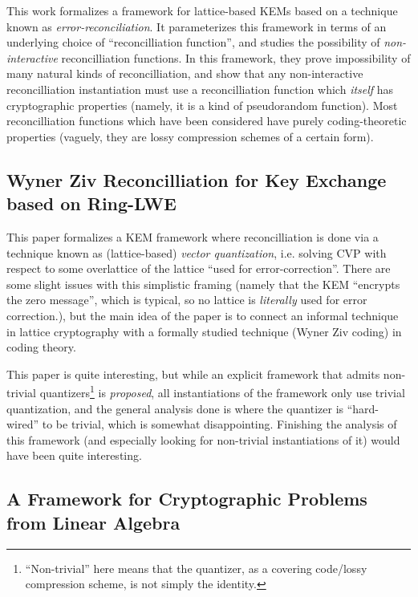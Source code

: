 \documentclass{article}
\begin{document}
	This work formalizes a framework for lattice-based KEMs based on a technique known as \emph{error-reconciliation}.
	It parameterizes this framework in terms of an underlying choice of ``reconcilliation function'', and studies the possibility of \emph{non-interactive} reconcilliation functions.
	In this framework, they prove impossibility of many natural kinds of reconcilliation, and show that any non-interactive reconcilliation instantiation must use a reconcilliation function which \emph{itself} has cryptographic properties (namely, it is a kind of pseudorandom function).
	Most reconcilliation functions which have been considered have purely coding-theoretic properties (vaguely, they are lossy compression schemes of a certain form).
	
	\subsection{Wyner Ziv Reconcilliation for Key Exchange based on Ring-LWE}
	This paper formalizes a KEM framework where reconcilliation is done via a technique known as (lattice-based) \emph{vector quantization}, i.e. solving CVP with respect to some overlattice of the lattice ``used for error-correction''.
	There are some slight issues with this simplistic framing (namely that the KEM ``encrypts the zero message'', which is typical, so no lattice is \emph{literally} used for error correction.), but the main idea of the paper is to connect an informal technique in lattice cryptography with a formally studied technique (Wyner Ziv coding) in coding theory.
	
	This paper is quite interesting, but while an explicit framework that admits non-trivial quantizers\footnote{``Non-trivial'' here means that the quantizer, as a covering code/lossy compression scheme, is not simply the identity.} is \emph{proposed}, all instantiations of the framework only use trivial quantization, and the general analysis done is where the quantizer is ``hard-wired'' to be trivial, which is somewhat disappointing.
	Finishing the analysis of this framework (and especially looking for non-trivial instantiations of it) would have been quite interesting.
	
	
	\subsection{A Framework for Cryptographic Problems from Linear Algebra}
	
\end{document}

